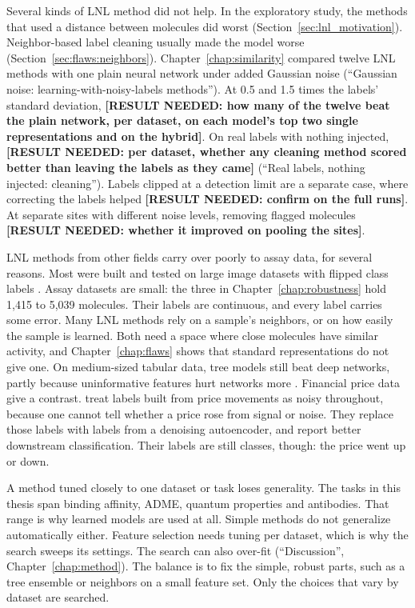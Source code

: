 Several kinds of LNL method did not help. In the exploratory study, the methods that used a distance between molecules did worst (Section~\ref{sec:lnl_motivation}). Neighbor-based label cleaning usually made the model worse (Section~\ref{sec:flaws:neighbors}). Chapter~\ref{chap:similarity} compared twelve LNL methods with one plain neural network under added Gaussian noise (``Gaussian noise: learning-with-noisy-labels methods''). At 0.5 and 1.5 times the labels' standard deviation, \textbf{[RESULT NEEDED: how many of the twelve beat the plain network, per dataset, on each model's top two single representations and on the hybrid]}. On real labels with nothing injected, \textbf{[RESULT NEEDED: per dataset, whether any cleaning method scored better than leaving the labels as they came]} (``Real labels, nothing injected: cleaning''). Labels clipped at a detection limit are a separate case, where correcting the labels helped \textbf{[RESULT NEEDED: confirm on the full runs]}. At separate sites with different noise levels, removing flagged molecules \textbf{[RESULT NEEDED: whether it improved on pooling the sites]}.

LNL methods from other fields carry over poorly to assay data, for several reasons. Most were built and tested on large image datasets with flipped class labels \citep{Song2022}. Assay datasets are small: the three in Chapter~\ref{chap:robustness} hold 1,415 to 5,039 molecules. Their labels are continuous, and every label carries some error. Many LNL methods rely on a sample's neighbors, or on how easily the sample is learned. Both need a space where close molecules have similar activity, and Chapter~\ref{chap:flaws} shows that standard representations do not give one. On medium-sized tabular data, tree models still beat deep networks, partly because uninformative features hurt networks more \citep{Grinsztajn2022}. Financial price data give a contrast. \citet{Ma2022} treat labels built from price movements as noisy throughout, because one cannot tell whether a price rose from signal or noise. They replace those labels with labels from a denoising autoencoder, and report better downstream classification. Their labels are still classes, though: the price went up or down.

A method tuned closely to one dataset or task loses generality. The tasks in this thesis span binding affinity, ADME, quantum properties and antibodies. That range is why learned models are used at all. Simple methods do not generalize automatically either. Feature selection needs tuning per dataset, which is why the search sweeps its settings. The search can also over-fit (``Discussion'', Chapter~\ref{chap:method}). The balance is to fix the simple, robust parts, such as a tree ensemble or neighbors on a small feature set. Only the choices that vary by dataset are searched.



